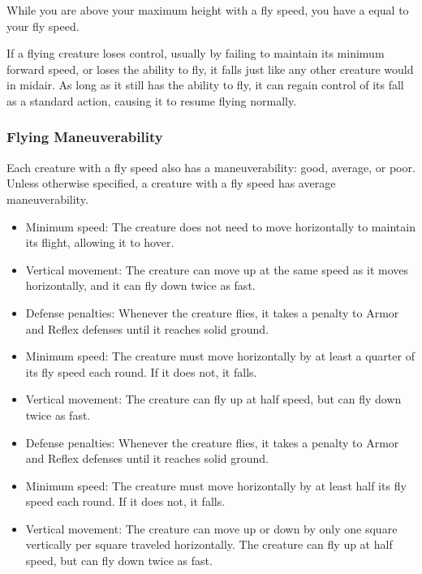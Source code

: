         While you are above your maximum height with a fly speed, you have a  equal to your fly speed.

         If a flying creature loses control, usually by failing to maintain its minimum forward speed, or loses the ability to fly, it falls just like any other creature would in midair. As long as it still has the ability to fly, it can regain control of its fall as a standard action, causing it to resume flying normally.

        \subsubsection{Flying Maneuverability}\label{Flying Maneuverability}
        Each creature with a fly speed also has a maneuverability: good, average, or poor.
        Unless otherwise specified, a creature with a fly speed has average maneuverability.

            \begin{itemize}
                \item Minimum speed: The creature does not need to move horizontally to maintain its flight, allowing it to hover.
                \item Vertical movement: The creature can move up at the same speed as it moves horizontally, and it can fly down twice as fast.
            \end{itemize}

            \begin{itemize}
                \item Defense penalties: Whenever the creature flies, it takes a  penalty to Armor and Reflex defenses until it reaches solid ground.
                \item Minimum speed: The creature must move horizontally by at least a quarter of its fly speed each round. If it does not, it falls.
                \item Vertical movement: The creature can fly up at half speed, but can fly down twice as fast.
            \end{itemize}

            \begin{itemize}
                \item Defense penalties: Whenever the creature flies, it takes a  penalty to Armor and Reflex defenses until it reaches solid ground.
                \item Minimum speed: The creature must move horizontally by at least half its fly speed each round. If it does not, it falls.
                \item Vertical movement: The creature can move up or down by only one square vertically per square traveled horizontally.
                    The creature can fly up at half speed, but can fly down twice as fast.
            \end{itemize}

